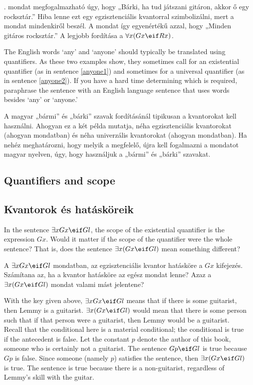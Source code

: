 . mondat megfogalmazható úgy, hogy „Bárki, ha tud játszani gitáron, akkor ő egy rocksztár.” Hiba lenne ezt egy egzisztenciális kvantorral szimbolizálni, mert a mondat mindenkiről beszél. A mondat így egyenértékű azzal, hogy „Minden gitáros rocksztár.” A legjobb fordítása a $\forall x(Gx \eif Rx)$. 


The English words `any' and `anyone' should typically be translated using quantifiers. As these two examples show, they sometimes call for an existential quantifier (as in sentence \ref{anyone1}) and sometimes for a universal quantifier (as in sentence \ref{anyone2}). If you have a hard time determining which is required, paraphrase the sentence with an English language sentence that uses words besides `any' or `anyone.'

A magyar „bármi” és „bárki” szavak fordításánál tipikusan a kvantorokat kell használni. Ahogyan ez a két példa mutatja, néha egzisztenciális kvantorokat (ahogyan  mondatban) és néha univerzális kvantorokat (ahogyan  mondatban). Ha nehéz meghatározni, hogy melyik a megfelelő, újra kell fogalmazni a mondatot magyar nyelven, úgy, hogy használjuk a „bármi” és „bárki” szavakat. 


\subsection*{Quantifiers and scope}
\subsection{Kvantorok és hatásköreik}


In the sentence $\exists x Gx \eif Gl$, the scope of the existential quantifier is the expression $Gx$. Would it matter if the scope of the quantifier were the whole sentence? That is, does the sentence $\exists x (Gx \eif Gl)$ mean something different?

A $\exists x Gx \eif Gl$ mondatban, az egzisztenciális kvantor hatásköre a $Gx$ kifejezés. Számítana az, ha a kvantor hatásköre az egész mondat lenne? Azaz a $\exists x (Gx \eif Gl)$ mondat valami mást jelentene?


With the key given above, $\exists x Gx \eif Gl$ means that if there is some guitarist, then Lemmy is a guitarist. $\exists x (Gx \eif Gl)$ would mean that there is some person such that if that person were a guitarist, then Lemmy would be a guitarist. Recall that the conditional here is a material conditional; the conditional is true if the antecedent is false. Let the constant $p$ denote the author of this book, someone who is certainly not a guitarist. The sentence $Gp \eif Gl$ is true because $Gp$ is false. Since someone (namely $p$) satisfies the sentence, then $\exists x (Gx \eif Gl)$ is true. The sentence is true because there is a non-guitarist, regardless of Lemmy's skill with the guitar.

